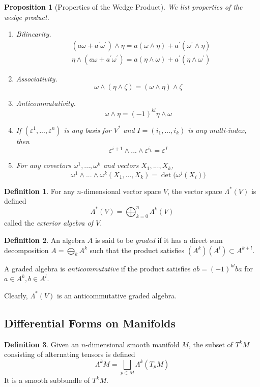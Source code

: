 \documentclass{article}
\newtheorem{proposition}[theorem]{Proposition}
\theoremstyle{remark}
\theoremstyle{definition}
\newtheorem{definition}{Definition}[section]
\begin{document}
\begin{proposition}[Properties of the Wedge Product]
We list properties of the wedge product. 
\begin{enumerate}
    \item Bilinearity. 
    \begin{align*}
        & (a \omega + a^\prime \omega^\prime) \wedge \eta = a (\omega \wedge \eta) + a^\prime (\omega^\prime \wedge \eta) \\
        & \eta \wedge (a \omega + a^\prime \omega^\prime) = a (\eta \wedge \omega) + a^\prime (\eta \wedge \omega^\prime) 
    \end{align*}
    \item Associativity. 
    \[\omega \wedge (\eta \wedge \zeta) = (\omega \wedge \eta) \wedge \zeta\]
    \item Anticommutativity. 
    \[\omega \wedge \eta = (-1)^{kl} \eta \wedge \omega\]
    \item If $(\varepsilon^1, ..., \varepsilon^n)$ is any basis for $V^*$ and $I = (i_1,..., i_k)$ is any multi-index, then 
    \[\varepsilon^{i+1} \wedge ... \wedge \varepsilon^{i_k} = \varepsilon^I\]
    \item For any covectors $\omega^1, ..., \omega^k$ and vectors $X_1, ..., X_k$, 
    \[\omega^1 \wedge ... \wedge \omega^k (X_1, ..., X_k) = \det \big( \omega^j (X_i)\big) \]
\end{enumerate}
\end{proposition}

\begin{definition}
For any $n$-dimensional vector space $V$, the vector space $\Lambda^* (V)$ is defined
\[\Lambda^* (V) = \bigoplus_{k=0}^n \Lambda^k (V)\]
called the \textit{exterior algebra of $V$}. 
\end{definition}

\begin{definition}
An algebra $A$ is said to be \textit{graded} if it has a direct sum decomposition $A = \bigoplus_k A^k$ such that the product satisfies $(A^k) (A^l) \subset A^{k+l}$. 

A graded algebra is \textit{anticommutative} if the product satisfies $ab = (-1)^{kl} ba$ for $a \in A^k, b \in A^l$. 
\end{definition}

Clearly, $\Lambda^* (V)$ is an anticommutative graded algebra. 

\subsection{Differential Forms on Manifolds}
\begin{definition}
Given an $n$-dimensional smooth manifold $M$, the subset of $T^k M$ consisting of alternating tensors is defined
\[\Lambda^k M = \bigsqcup_{p \in M} \Lambda^k (T_p M)\]
It is a smooth subbundle of $T^k M$. 
\end{definition}
\end{document}
